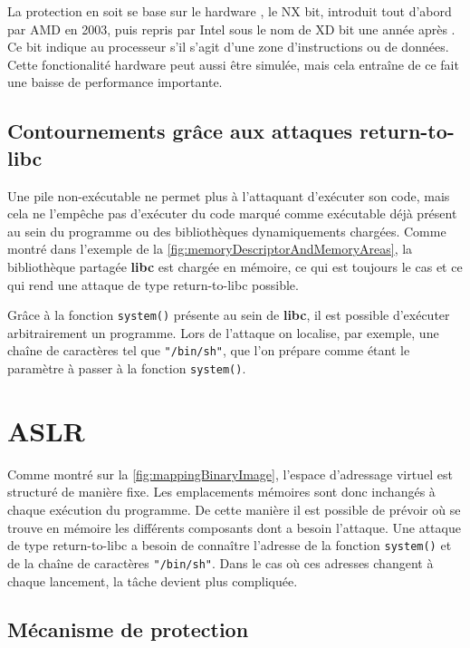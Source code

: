 La protection en soit se base sur le \og hardware \fg, le NX bit, introduit tout d'abord par AMD en 2003, puis repris par Intel sous le nom de \og XD bit \fg une année après \cite{ExecutableSpaceProtection, NXBit}. Ce bit indique au processeur s'il s'agit d'une zone d'instructions ou de données. Cette fonctionalité \og hardware \fg peut aussi être simulée, mais cela entraîne de ce fait une baisse de performance importante.

\subsection{Contournements grâce aux attaques \og return-to-libc \fg}

Une pile non-exécutable ne permet plus à l'attaquant d'exécuter son code, mais cela ne l'empêche pas d'exécuter du code marqué comme exécutable déjà présent au sein du programme ou des bibliothèques dynamiquements chargées. Comme montré dans l'exemple de la \autoref{fig:memoryDescriptorAndMemoryAreas}, la bibliothèque partagée \textbf{libc} est chargée en mémoire, ce qui est toujours le cas et ce qui rend une attaque de type \og return-to-libc \fg \cite{ReturntolibcAttack} possible.

Grâce à la fonction \texttt{system()} présente au sein de \textbf{libc}, il est possible d'exécuter arbitrairement un programme. Lors de l'attaque on localise, par exemple, une chaîne de caractères tel que \texttt{"/bin/sh"}, que l'on prépare comme étant le paramètre à passer à la fonction \texttt{system()}.

\section{ASLR}
\label{section:aslr}

Comme montré sur la \autoref{fig:mappingBinaryImage}, l'espace d'adressage virtuel est structuré de manière fixe. Les emplacements mémoires sont donc inchangés à chaque exécution du programme. De cette manière il est possible de prévoir où se trouve en mémoire les différents composants dont a besoin l'attaque. Une attaque de type \og return-to-libc \fg a besoin de connaître l'adresse de la fonction \texttt{system()} et de la chaîne de caractères \texttt{"/bin/sh"}. Dans le cas où ces adresses changent à chaque lancement, la tâche devient plus compliquée.

\subsection{Mécanisme de protection}

